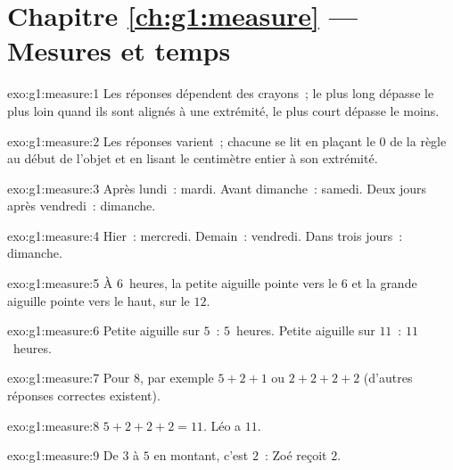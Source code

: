 \section*{Chapitre \ref{ch:g1:measure} --- Mesures et temps}

\begin{solution}{exo:g1:measure:1}
Les réponses dépendent des crayons~; le plus long dépasse le
plus loin quand ils sont alignés à une extrémité, le plus
court dépasse le moins.
\end{solution}

\begin{solution}{exo:g1:measure:2}
Les réponses varient~; chacune se lit en plaçant le $0$ de la
règle au début de l'objet et en lisant le centimètre entier à
son extrémité.
\end{solution}

\begin{solution}{exo:g1:measure:3}
Après lundi~: mardi. Avant dimanche~: samedi. Deux jours après
vendredi~: dimanche.
\end{solution}

\begin{solution}{exo:g1:measure:4}
Hier~: mercredi. Demain~: vendredi. Dans trois jours~: dimanche.
\end{solution}

\begin{solution}{exo:g1:measure:5}
À $6$~heures, la petite aiguille pointe vers le $6$ et la grande
aiguille pointe vers le haut, sur le $12$.
\end{solution}

\begin{solution}{exo:g1:measure:6}
Petite aiguille sur $5$~: $5$~heures. Petite aiguille sur $11$~:
$11$~heures.
\end{solution}

\begin{solution}{exo:g1:measure:7}
Pour $8$, par exemple $5 + 2 + 1$ ou $2 + 2 + 2 + 2$ (d'autres
réponses correctes existent).
\end{solution}

\begin{solution}{exo:g1:measure:8}
$5 + 2 + 2 + 2 = 11$. Léo a $11$.
\end{solution}

\begin{solution}{exo:g1:measure:9}
De $3$ à $5$ en montant, c'est $2$~: Zoé reçoit $2$.
\end{solution}
